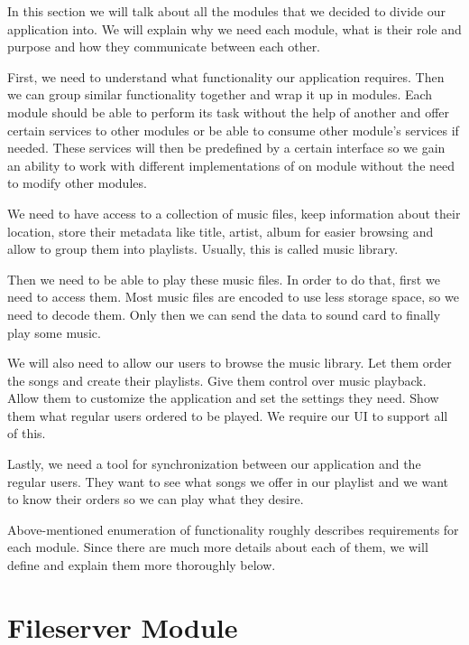 In this section we will talk about all the modules that we decided to divide our application into. We will explain why we need each module, what is their role and purpose and how they communicate between each other.
\par
First, we need to understand what functionality our application requires. Then we can group similar functionality together and wrap it up in modules. Each module should be able to perform its task without the help of another and offer certain services to other modules or be able to consume other module's services if needed. These services will then be predefined by a certain interface so we gain an ability to work with different implementations of on module without the need to modify other modules.
\par
We need to have access to a collection of music files, keep information about their location, store their metadata like title, artist, album for easier browsing and allow to group them into playlists. Usually, this is called music library.
\par
Then we need to be able to play these music files. In order to do that, first we need to access them. Most music files are encoded to use less storage space, so we need to decode them. Only then we can send the data to sound card to finally play some music.
\par
We will also need to allow our users to browse the music library. Let them order the songs and create their playlists. Give them control over music playback. Allow them to customize the application and set the settings they need. Show them what regular users ordered to be played. We require our UI to support all of this.
\par
Lastly, we need a tool for synchronization between our application and the regular users. They want to see what songs we offer in our playlist and we want to know their orders so we can play what they desire.
\par
Above-mentioned enumeration of functionality roughly describes requirements for each module. Since there are much more details about each of them, we will define and explain them more thoroughly below.

\section {Fileserver Module}

